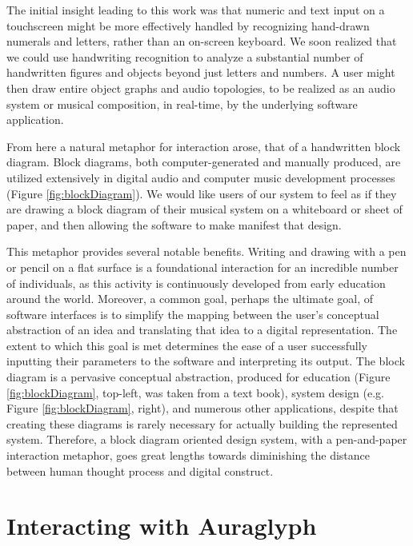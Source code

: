 \documentclass{nime-alternate}
\begin{document}
The initial insight leading to this work was that numeric and text input on a touchscreen might be more effectively handled by recognizing hand-drawn numerals and letters, rather than an on-screen keyboard. 
We soon realized that we could use handwriting recognition to analyze a substantial number of handwritten figures and objects beyond just letters and numbers. 
A user might then draw entire object graphs and audio topologies, to be realized as an audio system or musical composition, in real-time, by the underlying software application. 

From here a natural metaphor for interaction arose, that of a handwritten block diagram.
Block diagrams, both computer-generated and manually produced, are utilized extensively in digital audio and computer music development processes (Figure \ref{fig:blockDiagram}). 
We would like users of our system to feel as if they are drawing a block diagram of their musical system on a whiteboard or sheet of paper, and then allowing the software to make manifest that design. 

This metaphor provides several notable benefits. 
Writing and drawing with a pen or pencil on a flat surface is a foundational interaction for an incredible number of individuals, as this activity is continuously developed from early education around the world. 
Moreover, a common goal, perhaps the ultimate goal, of software interfaces is to simplify the mapping between the user's conceptual abstraction of an idea and translating that idea to a digital representation. 
The extent to which this goal is met determines the ease of a user successfully inputting their parameters to the software and interpreting its output. 
The block diagram is a pervasive conceptual abstraction, produced for education (Figure \ref{fig:blockDiagram}, top-left, was taken from a text book), system design (e.g. Figure \ref{fig:blockDiagram}, right), and numerous other applications, despite that creating these diagrams is rarely necessary for actually building the represented system. 
Therefore, a block diagram oriented design system, with a pen-and-paper interaction metaphor, goes great lengths towards diminishing the distance between human thought process and digital construct. 


\section{Interacting with Auraglyph}
\label{sec:SystemDescription}
\end{document}

